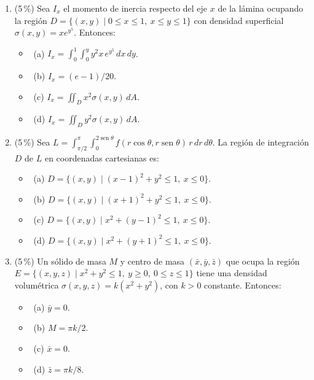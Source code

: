 \documentclass[11pt]{article}
\begin{document}
\begin{enumerate}
\item{} (5\,\%) Sea $I_x$ el momento de inercia respecto del eje $x$ de la lámina ocupando la región $D = \{(x,y) \mid 0 \leq x \leq 1,\ x \leq y \leq 1\}$ con densidad superficial $\sigma(x,y) = xe^{y^5}$. Entonces:
\begin{itemize}
\item[] \fbox{\phantom{x}}\ (a) $I_x = \displaystyle\int_0^1 \int_0^y y^2 x\, e^{y^5}\,dx\,dy$.
\item[] \fbox{\phantom{x}}\ (b) $I_x = (e - 1)/20$.
\item[] \fbox{\phantom{x}}\ (c) $I_x = \displaystyle\iint_D x^2 \sigma(x,y)\,dA$.
\item[] \fbox{\phantom{x}}\ (d) $I_x = \displaystyle\iint_D y^2 \sigma(x,y)\,dA$.
\end{itemize}

\item{} (5\,\%) Sea $L = \displaystyle\int_{\pi/2}^{\pi} \int_0^{2\operatorname{sen}\theta} f(r\cos\theta, r\operatorname{sen}\theta)\,r\,dr\,d\theta$. La región de integración $D$ de $L$ en coordenadas cartesianas es:
\begin{itemize}
\item[] \fbox{\phantom{x}}\ (a) $D = \{(x,y) \mid (x - 1)^2 + y^2 \leq 1,\ x \leq 0\}$.
\item[] \fbox{\phantom{x}}\ (b) $D = \{(x,y) \mid (x + 1)^2 + y^2 \leq 1,\ x \leq 0\}$.
\item[] \fbox{\phantom{x}}\ (c) $D = \{(x,y) \mid x^2 + (y - 1)^2 \leq 1,\ x \leq 0\}$.
\item[] \fbox{\phantom{x}}\ (d) $D = \{(x,y) \mid x^2 + (y + 1)^2 \leq 1,\ x \leq 0\}$.
\end{itemize}

\item{} (5\,\%) Un sólido de masa $M$ y centro de masa $(\bar x, \bar y, \bar z)$ que ocupa la región $E = \{(x,y,z) \mid x^2 + y^2 \leq 1,\ y \geq 0,\ 0 \leq z \leq 1\}$ tiene una densidad volumétrica $\sigma(x,y,z) = k(x^2 + y^2)$, con $k > 0$ constante. Entonces:
\begin{itemize}
\item[] \fbox{\phantom{x}}\ (a) $\bar y = 0$.
\item[] \fbox{\phantom{x}}\ (b) $M = \pi k/2$.
\item[] \fbox{\phantom{x}}\ (c) $\bar x = 0$.
\item[] \fbox{\phantom{x}}\ (d) $\bar z = \pi k/8$.
\end{itemize}


\end{enumerate}
\end{document}
